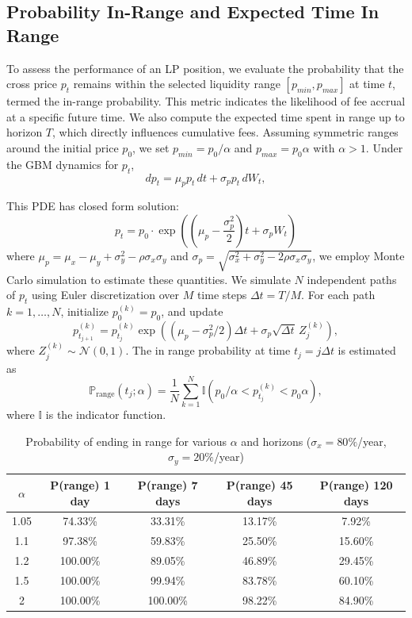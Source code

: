 \documentclass{article}
\begin{document}
\subsection{Probability In-Range and Expected Time In Range}
To assess the performance of an LP position, we evaluate the probability that the cross price $p_t$ remains within the selected liquidity range $[p_{min}, p_{max}]$ at time $t$, termed the in-range probability. This metric indicates the likelihood of fee accrual at a specific future time. We also compute the expected time spent in range up to horizon $T$, which directly influences cumulative fees.
Assuming symmetric ranges around the initial price $p_0$, we set $p_{min} = p_0 / \alpha$ and $p_{max} = p_0 \alpha$ with $\alpha > 1$. Under the GBM dynamics for $p_t$,
$$dp_t = \mu_p p_t \, dt + \sigma_p p_t \, dW_t,$$

This PDE has closed form solution:
\begin{equation}
    p_t = p_0\cdot \exp \left(\left( \mu_p - \frac{\sigma_p^2}{2}\right)t + \sigma_pW_t\right)
    \label{GBM_solution}
\end{equation}
where $\mu_p = \mu_x - \mu_y + \sigma_y^2 - \rho \sigma_x \sigma_y$ and $\sigma_p = \sqrt{\sigma_x^2 + \sigma_y^2 - 2 \rho \sigma_x \sigma_y}$, we employ Monte Carlo simulation to estimate these quantities.
We simulate $N$ independent paths of $p_t$ using Euler discretization over $M$ time steps $\Delta t = T/M$. For each path $k=1,\dots,N$, initialize $p_0^{(k)} = p_0$, and update
$$p_{t_{j+1}}^{(k)} = p_{t_j}^{(k)} \exp\left( (\mu_p - \sigma_p^2 / 2) \Delta t + \sigma_p \sqrt{\Delta t} \, Z_j^{(k)} \right),$$
where $Z_j^{(k)} \sim \mathcal{N}(0,1)$.\newline
The in range probability at time $t_j = j \Delta t$ is estimated as
$$\mathbb{P}_{\text{range}}(t_j; \alpha) = \frac{1}{N} \sum_{k=1}^N \mathbb{I}\left( p_0 / \alpha < p_{t_j}^{(k)} < p_0 \alpha \right),$$
where $\mathbb{I}$ is the indicator function.\newline

\begin{table}[h]
\centering
\begin{tabular}{|c|c|c|c|c|}
\hline
$\alpha$ & P(range) 1 day & P(range) 7 days & P(range) 45 days & P(range) 120 days \\ \hline
1.05 & 74.33\% & 33.31\% & 13.17\% & 7.92\% \\ \hline
1.1 & 97.38\% & 59.83\% & 25.50\% & 15.60\% \\ \hline
1.2 & 100.00\% & 89.05\% & 46.89\% & 29.45\% \\ \hline
1.5 & 100.00\% & 99.94\% & 83.78\% & 60.10\% \\ \hline
2 & 100.00\% & 100.00\% & 98.22\% & 84.90\% \\ \hline
\end{tabular}
\caption{Probability of ending in range for various $\alpha$ and horizons ($\sigma_x = 80\%$/year, $\sigma_y = 20\%$/year)}
\label{table:pitm_montecarlo}
\end{table}
\end{document}
